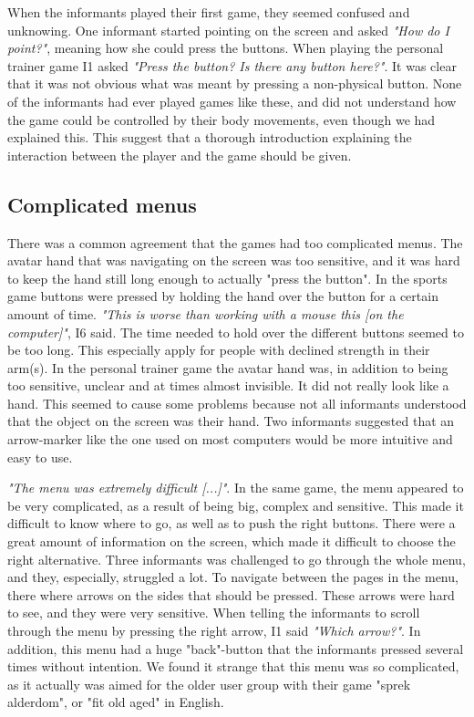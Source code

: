 When the informants played their first game, they seemed confused and unknowing. One informant started pointing on the screen and asked \emph{"How do I point?"}, meaning how she could press the buttons. When playing the personal trainer game I1 asked \emph{"Press the button? Is there any button here?"}. It was clear that it was not obvious what was meant by pressing a non-physical button. None of the informants had ever played games like these, and did not understand how the game could be controlled by their body movements, even though we had explained this. This suggest that a thorough introduction explaining the interaction between the player and the game should be given. 

\subsection{Complicated menus}
There was a common agreement that the games had too complicated menus.  The avatar hand that was navigating on the screen was too sensitive, and it was hard to keep the hand still long enough to actually "press the button". In the sports game buttons were pressed by holding the hand over the button for a certain amount of time. \emph{"This is worse than working with a mouse this [on the computer]"}, I6 said. The time needed to hold over the different buttons seemed to be too long. This especially apply for people with declined strength in their arm(s). In the personal trainer game the avatar hand was, in addition to being too sensitive, unclear and at times almost invisible. It did not really look like a hand. This seemed to cause some problems because not all informants understood that the object on the screen was their hand. Two informants suggested that an arrow-marker like the one used on most computers would be more intuitive and easy to use. 

\emph{"The menu was extremely difficult [...]"}. In the same game, the menu appeared to be very complicated, as a result of being big, complex and sensitive. This made it difficult to know where to go, as well as to push the right buttons. There were a great amount of information on the screen, which made it difficult to choose the right alternative. Three informants was challenged to go through the whole menu, and they, especially, struggled a lot. To navigate between the pages in the menu, there where arrows on the sides that should be pressed. These arrows were hard to see, and they were very sensitive. When telling the informants to scroll through the menu by pressing the right arrow, I1 said \emph{"Which arrow?"}. In addition, this menu had a huge "back"-button that the informants pressed several times without intention. We found it strange that this menu was so complicated, as it actually was aimed for the older user group with their game "sprek alderdom", or "fit old aged" in English.  

